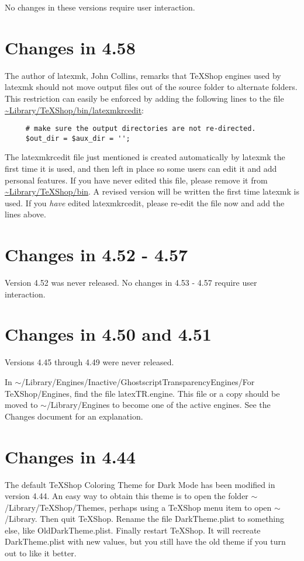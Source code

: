 \documentclass[11pt, oneside]{amsart}
\begin{document}
No changes in these versions require user interaction.  

\section{Changes in 4.58}

The author of latexmk, John Collins, remarks that TeXShop engines used by latexmk should not move output files out of the source folder to alternate folders. This restriction can easily be enforced by adding the following lines to the file \url{~Library/TeXShop/bin/latexmkrcedit}:
\begin{verbatim}
     # make sure the output directories are not re-directed.
     $out_dir = $aux_dir = '';
\end{verbatim}

The latexmkrcedit file just mentioned is created automatically by latexmk the first time it is used, and then left in place so some users can edit it and add personal features. If you have never edited this file, please remove it from
\url{~Library/TeXShop/bin}. A revised version will be written the first time latexmk is used. If you {\em have} edited latexmkrcedit, please re-edit the file now and add the lines above.

\section{Changes in 4.52 - 4.57}

Version 4.52 was never released. No changes in 4.53 - 4.57 require user interaction.  


\section{Changes in 4.50 and 4.51}

Versions 4.45 through 4.49 were never released. 

In  $\sim$/Library/Engines/Inactive/GhostscriptTransparencyEngines/For TeXShop/Engines, find the file  latexTR.engine. This file or a copy should be moved to $\sim$/Library/Engines to become one of the active engines. See the Changes document for an explanation.

\section{Changes in 4.44}

The default TeXShop Coloring Theme for Dark Mode has been modified in version 4.44. An easy way to obtain this theme is to open the folder $\sim$/Library/TeXShop/Themes, perhaps using a TeXShop menu item to open $\sim$/Library.  Then quit TeXShop. Rename the file DarkTheme.plist to something else, like OldDarkTheme.plist. Finally restart TeXShop. It will recreate DarkTheme.plist with new values, but you still have the old theme if you turn out to like it better.
\end{document}
